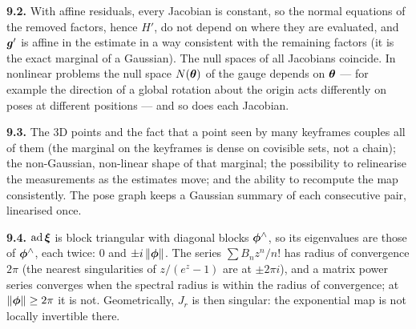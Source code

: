 \textbf{9.2.} With affine residuals, every Jacobian is constant, so the
normal equations of the removed factors, hence $H'$, do not depend on
where they are evaluated, and $\bm{g}'$ is affine in the estimate in a
way consistent with the remaining factors (it is the exact marginal of a
Gaussian). The null spaces of all Jacobians coincide. In nonlinear
problems the null space $N(\bm{\theta})$ of the gauge depends on $\bm{\theta}$
--- for example the direction of a global rotation about the origin acts
differently on poses at different positions --- and so does each
Jacobian.

\textbf{9.3.} The 3D points and the fact that a point seen by many
keyframes couples all of them (the marginal on the keyframes is dense on
covisible sets, not a chain); the non-Gaussian, non-linear shape of that
marginal; the possibility to relinearise the measurements as the
estimates move; and the ability to recompute the map consistently. The
pose graph keeps a Gaussian summary of each consecutive pair, linearised
once.

\textbf{9.4.} $\operatorname{ad}\bm{\xi}$ is block triangular with diagonal blocks
$\bm{\phi}^{\wedge}$, so its eigenvalues are those of $\bm{\phi}^{\wedge}$, each
twice: $0$ and $\pm i\left\lVert \bm{\phi}\right\rVert$. The series $\sum B_nz^n/n!$ has
radius of convergence $2\pi$ (the nearest singularities of $z/(e^z-1)$
are at $\pm2\pi i$), and a matrix power series converges when the
spectral radius is within the radius of convergence; at
$\left\lVert \bm{\phi}\right\rVert\ge2\pi$ it is not. Geometrically, $J_r$ is then singular:
the exponential map is not locally invertible there.
